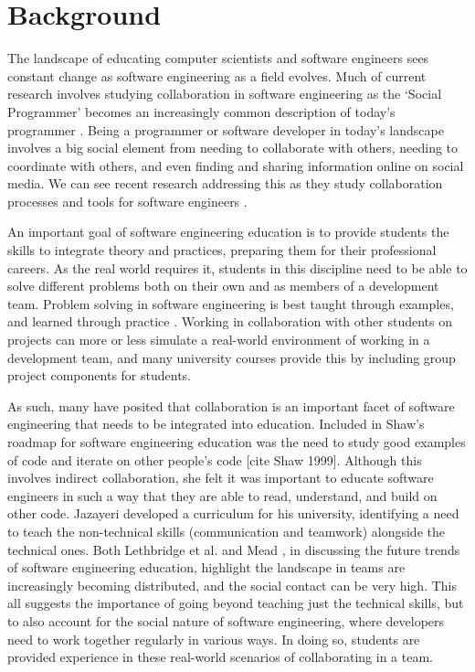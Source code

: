 \chapter{Background}

The landscape of educating computer scientists and software engineers sees constant change as software engineering as a field evolves. Much of current research involves studying collaboration in software engineering as the ‘Social Programmer’ becomes an increasingly common description of today’s programmer \cite{treude2012programming}. Being a programmer or software developer in today’s landscape involves a big social element from needing to collaborate with others, needing to coordinate with others, and even finding and sharing information online on social media. We can see recent research addressing this as they study collaboration processes and tools for software engineers \cite{whitehead2007collaboration}.

An important goal of software engineering education is to provide students the skills to integrate theory and practices, preparing them for their professional careers. As the real world requires it, students in this discipline need to be able to solve different problems both on their own and as members of a development team. Problem solving in software engineering is best taught through examples, and learned through practice \cite{jazayeri2004education}. Working in collaboration with other students on projects can more or less simulate a real-world environment of working in a development team, and many university courses provide this by including group project components for students.

As such, many have posited that collaboration is an important facet of software engineering that needs to be integrated into education. Included in Shaw’s roadmap for software engineering education was the need to study good examples of code and iterate on other people’s code [cite Shaw 1999]. Although this involves indirect collaboration, she felt it was important to educate software engineers in such a way that they are able to read, understand, and build on other code. Jazayeri \cite{jazayeri2004education} developed a curriculum for his university, identifying a need to teach the non-technical skills (communication and teamwork) alongside the technical ones. Both Lethbridge et al. \cite{lethbridge2007improving} and Mead \cite{mead2009software}, in discussing the future trends of software engineering education, highlight the landscape in teams are increasingly becoming distributed, and the social contact can be very high. This all suggests the importance of going beyond teaching just the technical skills, but to also account for the social nature of software engineering, where developers need to work together regularly in various ways. In doing so, students are provided experience in these real-world scenarios of collaborating in a team.

